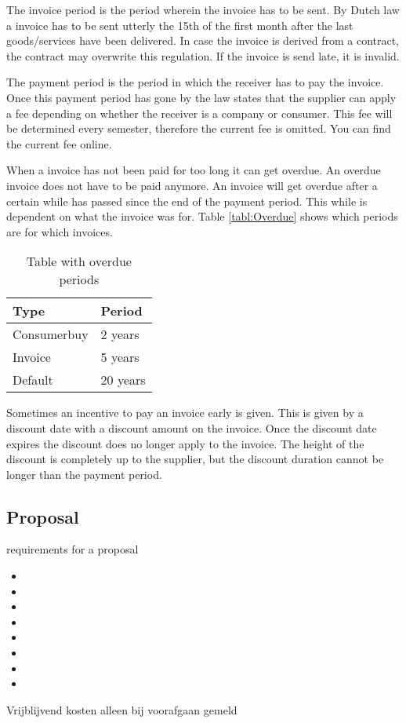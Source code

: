 \documentclass{report}
\begin{document}
The invoice period is the period wherein the invoice has to be sent. By Dutch law a invoice has to be sent utterly the 15th of the first month after the last goods/services have been delivered. In case the invoice is derived from a contract, the contract may overwrite this regulation. If the invoice is send late, it is invalid.

The payment period is the period in which the receiver has to pay the invoice. Once this payment period has gone by the law states that the supplier can apply a fee depending on whether the receiver is a company or consumer. This fee will be determined every semester, therefore the current fee is omitted. You can find the current fee online.

When a invoice has not been paid for too long it can get overdue. An overdue invoice does not have to be paid anymore. An invoice will get overdue after a certain while has passed since the end of the payment period. This while is dependent on what the invoice was for. Table \ref{tabl:Overdue} shows which periods are for which invoices.
\begin{table}[h]
	\centering
	\label{tab:Overdue}
	\begin{tabular}{l|l}
		Type        & Period   \\\hline \hline
		Consumerbuy & 2 years  \\\hline
		Invoice     & 5 years  \\\hline
		Default     & 20 years   	
	\end{tabular}
	\caption{Table with overdue periods}
\end{table}

Sometimes an incentive to pay an invoice early is given. This is given by a discount date with a discount amount on the invoice. Once the discount date expires the discount does no longer apply to the invoice. The height of the discount is completely up to the supplier, but the discount duration cannot be longer than the payment period.   

\subsection{Proposal} %
requirements for a proposal
\begin{itemize}
	\item 
	\item 
	\item 
	\item 
	\item 
	\item 
	\item 
	\item 
\end{itemize}
Vrijblijvend
kosten alleen bij voorafgaan gemeld
\end{document}
